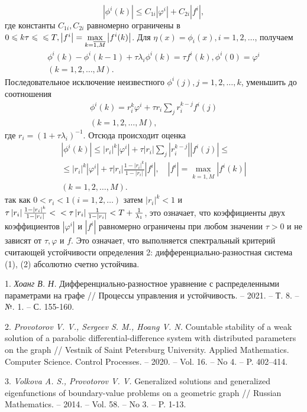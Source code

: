 $$
|\phi^{i}(k)| \leqslant C_{1i}\left|\varphi^{i}\right|+C_{2i}\left|f^{i}\right|,
$$
где константы $C_{1i}, C_{2i}$ равномерно ограничены в $0 \leqslant k \tau \leqslant\\ \leqslant T,\left|f^{i} \right|=\displaystyle\max_{k=\overline{1, M}}\left|f^{i}(k)\right|$.
Для $\eta(x)=\phi_{i}(x), i=1,2, \ldots$, получаем
$$
\begin{gathered}
	\phi^{i}(k)-\phi^{i}(k-1)+\tau \lambda_{i} \phi^{i}(k)=\tau f^{i}(k), \phi^{i}(0)=\varphi^{i} \\
	(k=1,2, \ldots, M).
\end{gathered}
$$
Последовательное исключение неизвестного $\phi^{i}(j), j=1,2, \ldots, k$, уменьшить до соотношения
$$
\begin{gathered}
	\phi^{i}(k)=r_{i}^{k} \varphi^{i}+\tau r_{i} \sum_{j} r_{i}^{k-j} f^{i}(j) \\
	(k=1,2, \ldots, M),
\end{gathered}
$$
где $r_{i}=\left(1+\tau \lambda_{i}\right)^{-1}$. Отсюда происходит оценка
$$
\begin{gathered}
	\left|\phi^{i}(k)\right| \leqslant\left|r_{i}\right|^{k}\left|\varphi^{i}\right|+\tau\left|r_{i}\right| \sum_{j}\left|r_{i}^{k-j}\right|\left|f^{i}(j)\right| \leqslant \\
	\leqslant\left|r_{i}\right|^{k}\left|\varphi^{i}\right|+\tau\left|r_{i}\right| \frac{1-\left|r_{i}\right|^{k}}{1-\left|r_{i}\right|}\left|f^{i}\right|, \quad\left|f^{i}\right|=\displaystyle\max_{k=\overline{1, M}}\left|f^{i}(k)\right| \\
	(k=1,2, \ldots, M) .
\end{gathered}
$$
так как $0<r_{i}<1(i=1,2, \ldots)$ затем $\left|r_{i}\right|^{k}<1$ и $\tau\left|r_{i}\right| \frac{1-\left|r_{i}\right|^{k}}{1-\left|r_{i}\right|}<\\<\tau\left|r_{i}\right| \frac{1}{1-\left|r_{i}\right|}<T+\frac{1}{\lambda_{1}}$, это означает, что коэффициенты двух коэффициентов $\left|\varphi^{i}\right|$ и $\left|f^{i}\right|$ равномерно ограничены при любом значении $\tau>0$ и не зависят от $\tau, \varphi$ и $f$. Это означает, что выполняется спектральный критерий считающей устойчивости определения 2: дифференциально-разностная система (1), (2) абсолютно счетно устойчива.

\litlist

1. {\it Хоанг В. Н.} Дифференциально-разностное уравнение с распределенными параметрами на графе // Процессы управления и устойчивость. – 2021. – Т. 8. – №. 1. – С. 155-160.

2. {\it Provotorov V. V., Sergeev S. M., Hoang V. N.} Countable stability of a weak solution of a parabolic differential-difference system with distributed parameters on the graph // Vestnik of Saint Petersburg University. Applied Mathematics. Computer Science. Control Processes. – 2020. – Vol. 16. – No 4. – P. 402–414.

3. {\it Volkova A. S., Provotorov V. V.} Generalized solutions and generalized eigenfunctions of boundary-value problems on a geometric graph // Russian Mathematics. – 2014. – Vol. 58. – No 3. – P. 1-13.

